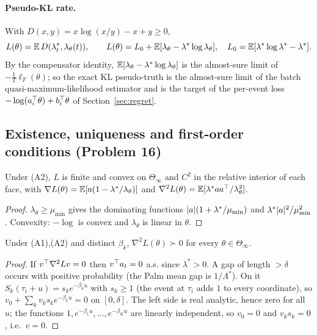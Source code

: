 \paragraph{Pseudo-KL rate.} With $D(x,y)=x\log(x/y)-x+y\ge0$,
\[
L(\theta)=\mathbb{E}\,D(\lambda^*_t,\lambda_\theta(t)),\qquad L(\theta)=L_0+\mathbb{E}[\lambda_\theta-\lambda^*\log\lambda_\theta],\quad L_0=\mathbb{E}[\lambda^*\log\lambda^*-\lambda^*].
\]
By the compensator identity, $\mathbb{E}[\lambda_\theta-\lambda^*\log\lambda_\theta]$ is the almost-sure limit of $-\tfrac1T\ell_T(\theta)$; so the exact KL pseudo-truth is the almost-sure limit of the batch quasi-maximum-likelihood estimator and is the target of the per-event loss $-\log(a_i^{\top}\theta)+b_i^{\top}\theta$ of Section~\ref{sec:regret}.

\subsection{Existence, uniqueness and first-order conditions (Problem 16)}\label{sec:mis-pseudo}

\begin{lemma}[derivatives]\label{lem:m-deriv}\Pt{}
Under (A2), $L$ is finite and convex on $\Theta_\infty$ and $C^2$ in the relative interior of each face, with
$\nabla L(\theta)=\mathbb{E}[a(1-\lambda^*/\lambda_\theta)]$ and $\nabla^2L(\theta)=\mathbb{E}[\lambda^*aa^{\top}/\lambda_\theta^2]$.
\end{lemma}
\begin{proof}
$\lambda_\theta\ge\mu_{\min}$ gives the dominating functions $\lvert a\rvert(1+\lambda^*/\mu_{\min})$ and $\lambda^*\lvert a\rvert^2/\mu_{\min}^2$. Convexity: $-\log$ is convex and $\lambda_\theta$ is linear in $\theta$.
\end{proof}

\begin{lemma}\label{lem:m-strict}\Pt{}
Under (A1),(A2) and distinct $\beta_k$, $\nabla^2L(\theta)\succ0$ for every $\theta\in\Theta_\infty$.
\end{lemma}
\begin{proof}
If $v^{\top}\nabla^2Lv=0$ then $v^{\top} a_t=0$ a.s. since $\lambda^*>0$. A gap of length $>\delta$ occurs with positive probability (the Palm mean gap is $1/\Lambda^*$). On it $S_k(\tau_i+u)=s_ke^{-\beta_ku}$ with $s_k\ge1$ (the event at $\tau_i$ adds $1$ to every coordinate), so $v_0+\sum_kv_ks_ke^{-\beta_ku}=0$ on $[0,\delta]$. The left side is real analytic, hence zero for all $u$; the functions $1,e^{-\beta_1u},\dots,e^{-\beta_Ku}$ are linearly independent, so $v_0=0$ and $v_ks_k=0$, i.e.\ $v=0$.
\end{proof}


